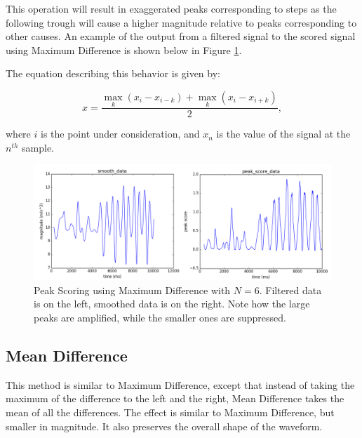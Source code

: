                 This operation will result in exaggerated peaks corresponding to steps as the following trough will cause a higher magnitude relative to peaks corresponding to other causes. An example of the output from a filtered signal to the scored signal using Maximum Difference is shown below in Figure \ref{max_diff_score}.

                The equation describing this behavior is given by:

                \begin{equation}
                x = \frac{\max\limits_k{(x_i - x_{i-k})} + \max\limits_k{(x_i - x_{i+k})}}{2},
                \end{equation}

                where $i$ is the point under consideration, and $x_n$ is the value of the signal at the $n^{th}$ sample.

                \begin{figure}[!th]
                    \includegraphics[width=\textwidth]{Images/max_diff_score.png}
                    \centering
                    \caption{Peak Scoring using Maximum Difference with $N=6$. Filtered data is on the left, smoothed data is on the right. Note how the large peaks are amplified, while the smaller ones are suppressed.}
                    \label{max_diff_score}
                \end{figure}                 

            \subsection{Mean Difference}

                This method is similar to Maximum Difference, except that instead of taking the maximum of the difference to the left and the right, Mean Difference takes the mean of all the differences. The effect is similar to Maximum Difference, but smaller in magnitude. It also preserves the overall shape of the waveform.

